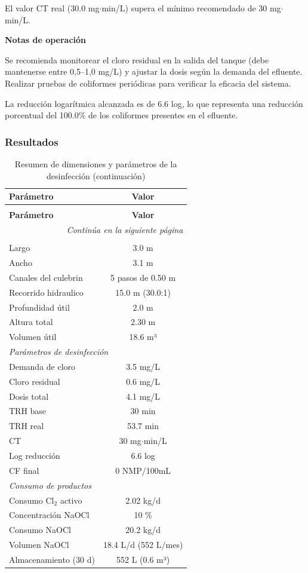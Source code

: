 \documentclass[12pt,a4paper]{article}
\begin{document}
El valor CT real (30.0 mg$⋅$min/L) supera el mínimo recomendado de 30 mg$⋅$min/L.


\textbf{Notas de operación}

Se recomienda monitorear el cloro residual en la salida del tanque (debe mantenerse entre 0,5--1,0 mg/L) y ajustar la dosis según la demanda del efluente. Realizar pruebas de coliformes periódicas para verificar la eficacia del sistema.

La reducción logarítmica alcanzada es de 6.6 log, lo que representa una reducción porcentual del 100.0\% de los coliformes presentes en el efluente.

\subsubsection{Resultados}

\begingroup
\small
\begin{longtable}{@{}lc@{}}
\caption{Resumen de dimensiones y parámetros de la desinfección}\\
\toprule
\textbf{Parámetro} & \textbf{Valor} \\
\midrule
\endfirsthead
\caption[]{Resumen de dimensiones y parámetros de la desinfección (continuación)}\\
\toprule
\textbf{Parámetro} & \textbf{Valor} \\
\midrule
\endhead
\midrule
\multicolumn{2}{r}{\textit{Continúa en la siguiente página}} \\
\endfoot
\bottomrule
\endlastfoot
\multicolumn{2}{l}{\textit{Dimensiones del tanque}} \\
\midrule
Largo & 3.0 m \\
Ancho & 3.1 m \\
Canales del culebrin & 5 pasos de 0.50 m \\
Recorrido hidraulico & 15.0 m (30.0:1) \\
Profundidad útil & 2.0 m \\
Altura total & 2.30 m \\
Volumen útil & 18.6 m³ \\
\midrule
\multicolumn{2}{l}{\textit{Parámetros de desinfección}} \\
\midrule
Demanda de cloro & 3.5 mg/L \\
Cloro residual & 0.6 mg/L \\
Dosis total & 4.1 mg/L \\
TRH base & 30 min \\
TRH real & 53.7 min \\
CT & 30 mg$\cdot$min/L \\
Log reducción & 6.6 log \\
CF final & 0 NMP/100mL \\
\midrule
\multicolumn{2}{l}{\textit{Consumo de productos}} \\
\midrule
Consumo Cl$_2$ activo & 2.02 kg/d \\
Concentración NaOCl & 10 \% \\
Consumo NaOCl & 20.2 kg/d \\
Volumen NaOCl & 18.4 L/d (552 L/mes) \\
Almacenamiento (30 d) & 552 L (0.6 m³) \\
\end{longtable}
\endgroup
\end{document}

